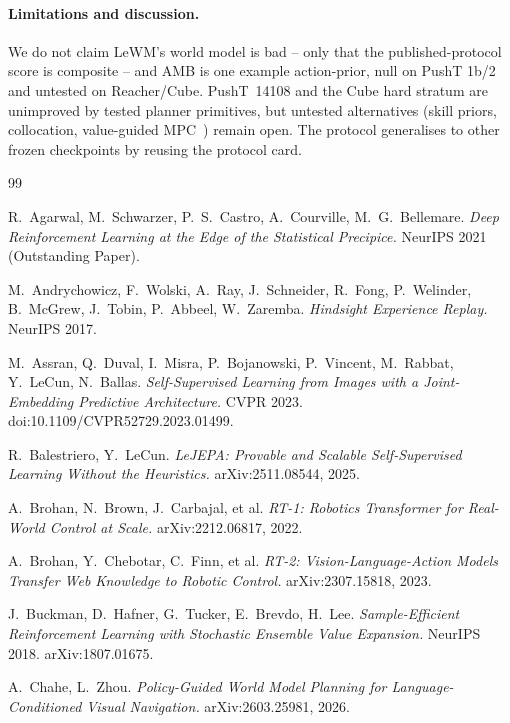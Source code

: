 \documentclass{article}
\begin{document}
\paragraph{Limitations and discussion.}
\label{sec:discussion}
We do not claim LeWM's world model is bad -- only that the published-protocol score is composite -- and AMB is one example action-prior, null on PushT 1b/2 and untested on Reacher/Cube. PushT~14108 and the Cube hard stratum are unimproved by tested planner primitives, but untested alternatives (skill priors, collocation, value-guided MPC~\cite{zhang2026hwm,chahe2026pijepa}) remain open. The protocol generalises to other frozen checkpoints by reusing the protocol card.

\begin{thebibliography}{99}

R.~Agarwal, M.~Schwarzer, P.~S.~Castro, A.~Courville, M.~G.~Bellemare.
\emph{Deep Reinforcement Learning at the Edge of the Statistical Precipice.}
NeurIPS 2021 (Outstanding Paper).

M.~Andrychowicz, F.~Wolski, A.~Ray, J.~Schneider, R.~Fong, P.~Welinder, B.~McGrew, J.~Tobin, P.~Abbeel, W.~Zaremba.
\emph{Hindsight Experience Replay.}
NeurIPS 2017.

M.~Assran, Q.~Duval, I.~Misra, P.~Bojanowski, P.~Vincent, M.~Rabbat, Y.~LeCun, N.~Ballas.
\emph{Self-Supervised Learning from Images with a Joint-Embedding Predictive Architecture.}
CVPR 2023. doi:10.1109/CVPR52729.2023.01499.

R.~Balestriero, Y.~LeCun.
\emph{LeJEPA: Provable and Scalable Self-Supervised Learning Without the Heuristics.}
arXiv:2511.08544, 2025.

A.~Brohan, N.~Brown, J.~Carbajal, et al.
\emph{RT-1: Robotics Transformer for Real-World Control at Scale.}
arXiv:2212.06817, 2022.

A.~Brohan, Y.~Chebotar, C.~Finn, et al.
\emph{RT-2: Vision-Language-Action Models Transfer Web Knowledge to Robotic Control.}
arXiv:2307.15818, 2023.

J.~Buckman, D.~Hafner, G.~Tucker, E.~Brevdo, H.~Lee.
\emph{Sample-Efficient Reinforcement Learning with Stochastic Ensemble Value Expansion.}
NeurIPS 2018. arXiv:1807.01675.

A.~Chahe, L.~Zhou.
\emph{Policy-Guided World Model Planning for Language-Conditioned Visual Navigation.}
arXiv:2603.25981, 2026.


\end{thebibliography}
\end{document}
